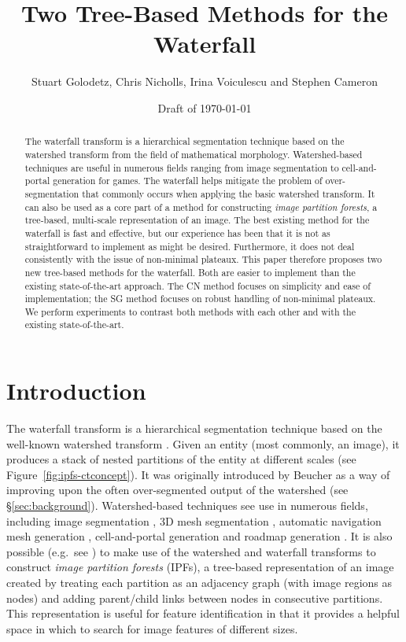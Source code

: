 \documentclass[a4paper]{article}
\begin{document}
\title{Two Tree-Based Methods for the Waterfall}
\author{Stuart Golodetz, Chris Nicholls, Irina Voiculescu and Stephen Cameron}
\date{Draft of \today}
\maketitle

\begin{abstract}
\noindent The waterfall transform is a hierarchical segmentation technique based on the watershed transform from the field of mathematical morphology. Watershed-based techniques are useful in numerous fields ranging from image segmentation to cell-and-portal generation for games. The waterfall helps mitigate the problem of over-segmentation that commonly occurs when applying the basic watershed transform. It can also be used as a core part of a method for constructing \emph{image partition forests}, a tree-based, multi-scale representation of an image. The best existing method for the waterfall is fast and effective, but our experience has been that it is not as straightforward to implement as might be desired. Furthermore, it does not deal consistently with the issue of non-minimal plateaux. This paper therefore proposes two new tree-based methods for the waterfall. Both are easier to implement than the existing state-of-the-art approach. The CN method focuses on simplicity and ease of implementation; the SG method focuses on robust handling of non-minimal plateaux. We perform experiments to contrast both methods with each other and with the existing state-of-the-art.
\end{abstract}

\section{Introduction}

The waterfall transform is a hierarchical segmentation technique based on the well-known watershed transform \cite{beucher90,gonzalez02}. Given an entity (most commonly, an image), it produces a stack of nested partitions of the entity at different scales (see Figure~\ref{fig:ipfs-ctconcept}). It was originally introduced by Beucher \cite{beucher94} as a way of improving upon the often over-segmented output of the watershed (see \S\ref{sec:background}). Watershed-based techniques see use in numerous fields, including image segmentation \cite{beucher91,grau04,gvccimi08,klava09}, 3D mesh segmentation \cite{chen06,mangan99,moumoun10,page03}, automatic navigation mesh generation \cite{mononen09}, cell-and-portal generation \cite{haumont03} and roadmap generation \cite{hamlin08}. It is also possible (e.g.~see \cite{golodetz11}) to make use of the watershed and waterfall transforms to construct \emph{image partition forests} (IPFs), a tree-based representation of an image created by treating each partition as an adjacency graph (with image regions as nodes) and adding parent/child links between nodes in consecutive partitions. This representation is useful for feature identification in that it provides a helpful space in which to search for image features of different sizes.
\end{document}
